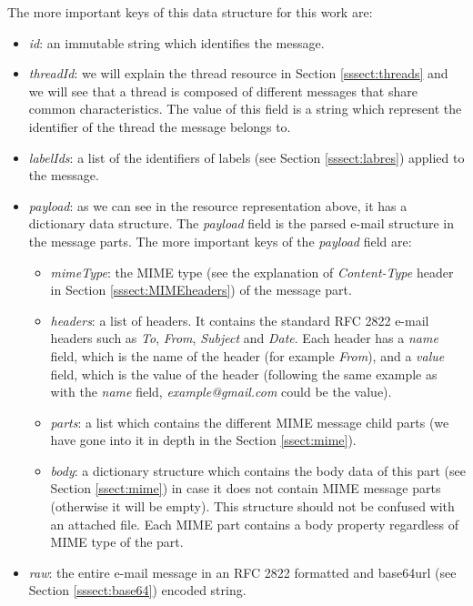 The more important keys of this data structure for this work are:
\begin{itemize}
	\item\textit{id}: an immutable string which identifies the message.
	\item\textit{threadId}: we will explain the thread resource in Section \ref{sssect:threads} and we will see that a thread is composed of different messages that share common characteristics. The value of this field is a string which represent the identifier of the thread the message belongs to.
	\item\textit{labelIds}: a list of the identifiers of labels (see Section \ref{sssect:labres}) applied to the message.
	\item\textit{payload}: as we can see in the resource representation above, it has a dictionary data structure. The \textit{payload} field is the parsed e-mail structure in the message parts. The more important keys of the \textit{payload} field are:
	\begin{itemize}
		\item\textit{mimeType}: the MIME type (see the explanation of \textit{Content-Type} header in Section \ref{sssect:MIMEheaders}) of the message part.
		\item\textit{headers}: a list of headers. It contains the standard RFC 2822 \citep{rfc2822} e-mail headers such as \textit{To}, \textit{From}, \textit{Subject} and \textit{Date}. Each header has a \textit{name} field, which is the name of the header (for example \textit{From}), and a \textit{value} field, which is the value of the header (following the same example as with the \textit{name} field, \textit{example@gmail.com} could be the value).
		\item\textit{parts}: a list which contains the different MIME message child parts (we have gone into it in depth in the Section \ref{ssect:mime}).
		\item\textit{body}: a dictionary structure which contains the body data of this part (see Section \ref{ssect:mime}) in case it does not contain MIME message parts (otherwise it will be empty). This structure should not be confused with an attached file. Each MIME part contains a body property regardless of MIME type of the part.
	\end{itemize}
	\item\textit{raw}: the entire e-mail message in an RFC 2822 \citep{rfc2822} formatted and base64url (see Section \ref{sssect:base64}) encoded string.
\end{itemize}

